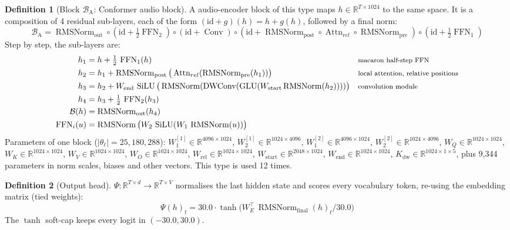 \documentclass[10pt,a4paper]{article}
\newcommand{\op}[1]{\operatorname{#1}}
\theoremstyle{definition}
\newtheorem{definition}{Definition}[section]
\begin{document}
\begin{definition}[Block $\mathcal{B}_{\mathrm{A}}$: Conformer audio block]
A audio-encoder block of this type maps $h\in\mathbb{R}^{T\times 1024}$ to the same space. It is a composition of 4 residual sub-layers, each of the form $(\mathrm{id}+g)(h)=h+g(h)$, followed by a final norm:
\begin{equation}
  \mathcal{B}_{\mathrm{A}} = \op{RMSNorm}_{\mathrm{out}}\circ(\mathrm{id}+\tfrac12\op{FFN}_2)\circ(\mathrm{id}+\op{Conv})\circ(\mathrm{id}+\op{RMSNorm}_{\mathrm{post}}\circ\op{Attn}_{rel}\circ\op{RMSNorm}_{\mathrm{pre}})\circ(\mathrm{id}+\tfrac12\op{FFN}_1)
\end{equation}
Step by step, the sub-layers are:
\begin{align*}
  h_1 &= h + \tfrac12\,\op{FFN}_1(h) && \text{\footnotesize macaron half-step FFN} \\
  h_2 &= h_1 + \op{RMSNorm}_{\mathrm{post}}\big(\op{Attn}_{rel}(\op{RMSNorm}_{\mathrm{pre}}(h_1))\big) && \text{\footnotesize local attention, relative positions} \\
  h_3 &= h_2 + W_{\mathrm{end}}\,\op{SiLU}\big(\op{RMSNorm}(\op{DWConv}(\op{GLU}(W_{\mathrm{start}}\op{RMSNorm}(h_2))))\big) && \text{\footnotesize convolution module} \\
  h_4 &= h_3 + \tfrac12\,\op{FFN}_2(h_3) \\
  \mathcal{B}(h) &= \op{RMSNorm}_{\mathrm{out}}(h_4) \\
  \op{FFN}_i(u) &= \op{RMSNorm}\big(W_2\,\op{SiLU}(W_1\,\op{RMSNorm}(u))\big)
\end{align*}
Parameters of one block ($|\theta_\ell|=25{,}180{,}288$): $W_1^{[1]}\in\mathbb{R}^{4096\times1024}$, $W_2^{[1]}\in\mathbb{R}^{1024\times4096}$, $W_1^{[2]}\in\mathbb{R}^{4096\times1024}$, $W_2^{[2]}\in\mathbb{R}^{1024\times4096}$, $W_Q\in\mathbb{R}^{1024\times1024}$, $W_K\in\mathbb{R}^{1024\times1024}$, $W_V\in\mathbb{R}^{1024\times1024}$, $W_O\in\mathbb{R}^{1024\times1024}$, $W_{\mathrm{rel}}\in\mathbb{R}^{1024\times1024}$, $W_{\mathrm{start}}\in\mathbb{R}^{2048\times1024}$, $W_{\mathrm{end}}\in\mathbb{R}^{1024\times1024}$, $K_{\mathrm{dw}}\in\mathbb{R}^{1024\times1\times5}$, plus 9,344 parameters in norm scales, biases and other vectors. This type is used 12 times.
\end{definition}
\begin{definition}[Output head]
$\Psi:\mathbb{R}^{T\times d}\to\mathbb{R}^{T\times V}$ normalises the last hidden state and scores every vocabulary token, re-using the embedding matrix (tied weights):
\begin{equation}
  \Psi(h)_t = 30.0\cdot\tanh\!\big(W_E^{\top}\,\op{RMSNorm}_{\mathrm{final}}(h)_t/30.0\big)
\end{equation}
The $\tanh$ soft-cap keeps every logit in $(-30.0,30.0)$.
\end{definition}
\end{document}

